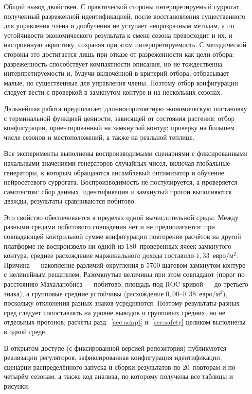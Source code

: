 \documentclass[12pt,a4paper,leqno]{article}
\begin{document}
Общий вывод двойствен. С практической стороны интерпретируемый суррогат, полученный
разреженной идентификацией, после восстановления существенного для управления члена и
дообучения не уступает непрозрачным методам, а по устойчивости экономического результата
к смене сезона превосходит и их, и настроенную эвристику, сохраняя при этом
интерпретируемость. С методической стороны это достигается лишь при отказе от
разреженности как цели отбора: разреженность способствует компактности описания, но не
тождественна интерпретируемости и, будучи включённой в критерий отбора, отбрасывает
малые, но существенные для управления члены. Поэтому отбор конфигурации следует вести с
проверкой в замкнутом контуре и на нескольких сезонах.

Дальнейшая работа предполагает длинногоризонтную экономическую постановку с терминальной
функцией ценности, зависящей от состояния растения; отбор конфигурации, ориентированный
на замкнутый контур; проверку на большем числе сезонов и местоположений, а также на
реальной теплице.

Все эксперименты выполнены воспроизводимыми сценариями с фиксированными начальными
значениями генераторов случайных чисел, включая глобальные генераторы, к которым
обращаются ансамблевый оптимизатор и обучение нейросетевого суррогата. Воспроизводимость
не постулируется, а проверяется самотестом: сбор данных, идентификация и замкнутый прогон
выполняются дважды, результаты сравниваются побитово.

Это свойство обеспечивается в пределах одной вычислительной среды. Между разными средами
побитового совпадения нет и не предполагается: при совпадающей контрольной сумме
конфигурации повторение расчётов на другой платформе не воспроизвело ни одной из
180~проверенных ячеек замкнутого контура, среднее расхождение маржинального дохода
составило $1{,}33$~евро/м$^2$. Причина — накопление различий округления в 5760-шаговом
замкнутом контуре с нелинейным решателем. Разомкнутые величины при этом совпадают (порог
по расстоянию Махаланобиса — побитово, площадь под ROC-кривой — до третьего знака), а
групповые средние устойчивы (расхождение $0{,}00$--$0{,}38$~евро/м$^2$), поскольку
отклонения разных знаков усредняются. Поэтому результаты разных сред следует сопоставлять
на уровне выводов и групповых средних, но не отдельных прогонов; расчёты
разд.~\ref{sec:adapt} и~\ref{sec:safety} целиком выполнены в одной среде.

В открытом доступе (с фиксированной версией репозитория) публикуются реализации
регуляторов, зафиксированная конфигурация идентификации, сценарии распределённого запуска
и сборки результатов по 20~повторам и по четырём сезонам, а также код анализа, по
которому получены все таблицы и рисунки.
\end{document}
